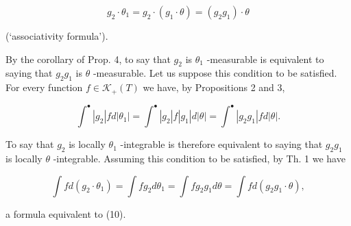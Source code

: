 \[
g _ {2} \cdot \theta_ {1} = g _ {2} \cdot (g _ {1} \cdot \theta) = (g _ {2} g _ {1}) \cdot \theta\tag{10}
\]

(`associativity formula').

By the corollary of Prop. 4, to say that \(g_{2}\) is \(\theta_{1}\) -measurable is equivalent to saying that \(g_{2}g_{1}\) is \(\theta\) -measurable. Let us suppose this condition to be satisfied. For every function \(f \in \mathcal{K}_{+}(T)\) we have, by Propositions 2 and 3,

\[
\int^ {\bullet} | g _ {2} | f d | \theta_ {1} | = \int^ {\bullet} | g _ {2} | f | g _ {1} | d | \theta | = \int^ {\bullet} | g _ {2} g _ {1} | f d | \theta |.
\]

To say that \(g_{2}\) is locally \(\theta_{1}\) -integrable is therefore equivalent to saying that \(g_{2}g_{1}\) is locally \(\theta\) -integrable. Assuming this condition to be satisfied, by Th. 1 we have

\[
\int f d \left(g _ {2} \cdot \theta_ {1}\right) = \int f g _ {2} d \theta_ {1} = \int f g _ {2} g _ {1} d \theta = \int f d \left(g _ {2} g _ {1} \cdot \theta\right),
\]

a formula equivalent to (10).
\relax{}
